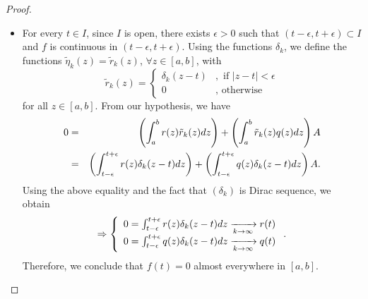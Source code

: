\documentclass[10pt,a4paper]{amsart}
\begin{document}
\begin{proof}
\begin{itemize}
\item[(ii)] 
For every $t \in I$, since $I$ is open, there exists $\epsilon > 0$ such that $(t-\epsilon, t+\epsilon) \subset I$ and $f$ is continuous in $(t-\epsilon, t+\epsilon)$. 
Using the functions $\delta_k$, we define the functions $\tilde{\eta}_k(z) = \tilde{r}_k(z)$, $\forall z \in [a,b]$, with 
$$
\tilde{r}_k(z) = \left\lbrace\begin{array}{cl}
\delta_k(z-t)    &, \mbox{ if } |z-t|< \epsilon \\
0     &, \mbox{ otherwise}  
\end{array}\right.$$
for all $z \in [a,b].$
From our hypothesis, we have
\begin{eqnarray*}
0 & = & \left(\int_{a}^{b} r(z)\tilde{r}_k(z) \textnormal{d}z\right) +     
\left(\int_{a}^{b} \tilde{r}_k(z)q(z)\textnormal{d}z\right)A \\
& = & \left(\int_{t-\epsilon}^{t+\epsilon} r(z)\delta_k(z-t) \textnormal{d}z\right) +     
\left(\int_{t-\epsilon}^{t+\epsilon} q(z)\delta_k(z-t)\textnormal{d}z\right)A.
\end{eqnarray*}
Using the above equality and the fact that $(\delta_k)$ is Dirac sequence, we obtain 
$$\Rightarrow \left\lbrace \begin{array}{l}
0 = \int_{t-\epsilon}^{t+\epsilon} r(z)\delta_k(z-t) \textnormal{d}z \xrightarrow[k\to \infty]{} r(t)     \\ 
0 = \int_{t-\epsilon}^{t+\epsilon} q(z)\delta_k(z-t) \textnormal{d}z \xrightarrow[k\to \infty]{} q(t)
\end{array}\right..
$$
Therefore, we conclude that $f(t) = 0$ almost everywhere in $[a,b].$
\end{itemize}
\end{proof}
\end{document}
